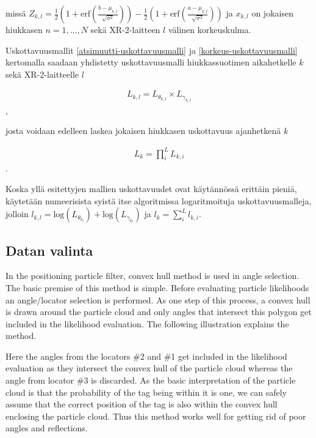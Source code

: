 \documentclass[
  12pt,
  a4paper, twoside]{book}
\begin{document}
missä \(Z_{k,l}=\frac{1}{2}(1+\text{erf}(\frac{b-\mu_{k,l}}{\sqrt{\sigma^2}}))-\frac{1}{2}(1+\text{erf}(\frac{a-\mu_{k,l}}{\sqrt{\sigma^2}}))\) ja \(x_{k,l}\) on jokaisen hiukkasen \(n=1,\ldots,N\) sekä XR-2-laitteen \(l\) välinen korkeuskulma.

Uskottavuusmallit \ref{atsimuutti-uskottavuusmalli} ja \ref{korkeus-uskottavuusmalli} kertomalla saadaan yhdistetty uskottavuusmalli hiukkassuotimen aikahetkelle \(k\) sekä XR-2-laitteelle \(l\)

\begin{align}\label{yhdistetty-uskottavuusmalli}
L_{k,l}=L_{\theta_{k,l}} \times L_{\gamma_{k,l}}
\end{align},

josta voidaan edelleen laskea jokaisen hiukkasen uskottavuus ajanhetkenä \(k\)

\begin{align}\label{lopullinen-uskottavuusmalli}
L_{k}=\prod_i^L L_{{k,i}}
\end{align}.

Koska yllä esitettyjen mallien uskottavuudet ovat käytännössä erittäin pieniä, käytetään numeerisista syistä itse algoritmissa logaritmoituja uskottavuusmalleja, jolloin \(l_{k,l} = \text{log}(L_{\theta_{k_l}}) + \text{log}(L_{\gamma_{k_l}})\) ja \(l_k = \sum_i^L l_{k,i}\).

\hypertarget{datan-valinta}{%
\subsection{Datan valinta}\label{datan-valinta}}

In the positioning particle filter, convex hull method is used in angle selection. The basic premise of this method is simple. Before evaluating particle likelihoods an angle/locator selection is performed. As one step of this process, a convex hull is drawn around the particle cloud and only angles that intersect this polygon get included in the likelihood evaluation. The following illustration explains the method.

Here the angles from the locators \#2 and \#1 get included in the likelihood evaluation as they intersect the convex hull of the particle cloud whereas the angle from locator \#3 is discarded.
As the basic interpretation of the particle cloud is that the probability of the tag being within it is one, we can safely assume that the correct position of the tag is also within the convex hull enclosing the particle cloud. Thus this method works well for getting rid of poor angles and reflections.
\end{document}
